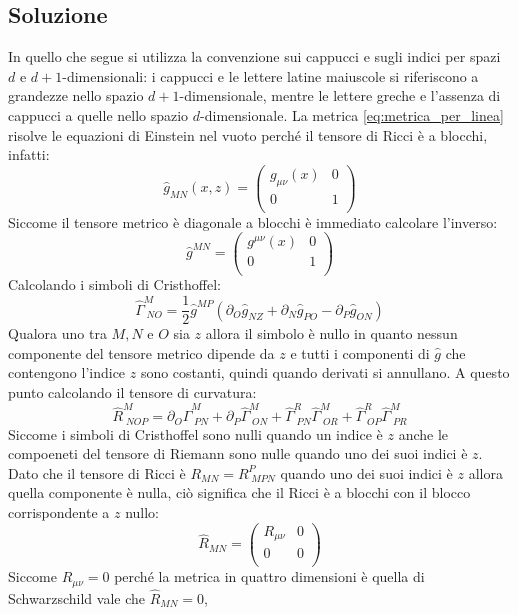 \documentclass[]{scrartcl}
\newcommand{\hg}{\hat{g}}
\begin{document}
\subsection*{Soluzione}
In quello che segue si utilizza la convenzione sui cappucci e sugli indici per spazi $ d $ e $ d+1 $-dimensionali: i cappucci e le lettere latine maiuscole
si riferiscono a grandezze nello spazio $ d+1 $-dimensionale, mentre le lettere greche e l'assenza di cappucci a quelle nello spazio $ d $-dimensionale.
La metrica \eqref{eq:metrica_per_linea} risolve le equazioni di Einstein nel vuoto perché il tensore di Ricci è a blocchi, infatti:
\[
  \hg_{M N}(x,z) =
  \begin{pmatrix}
    g_{\mu\nu}(x) & 0 \\
    0             & 1 \\
  \end{pmatrix}
\]
Siccome il tensore metrico è diagonale a blocchi è immediato calcolare l'inverso:
\[
  \hg^{M N} =
  \begin{pmatrix}
    g^{\mu\nu}(x) & 0 \\
    0             & 1 \\
  \end{pmatrix}
\]
Calcolando i simboli di Cristhoffel:
\[
  \hat{\Gamma}^{M}_{\;NO} = \frac{1}{2} \hg^{MP}\left( \partial_O \hg_{NZ} +  \partial_N \hg_{PO} -  \partial_P \hg_{ON}  \right)
\]
Qualora uno tra $ M, N $ e $ O $ sia $ z $ allora il simbolo è nullo in quanto nessun componente del tensore metrico
dipende da $ z $ e tutti i componenti di $ \hat{g} $ che contengono l'indice $ z $ sono costanti, quindi quando derivati si annullano.
A questo punto calcolando il tensore di curvatura:
\[
  \hat{R}^{M}_{\;NOP} = \partial_O \hat{\Gamma}^{M}_{\;PN} + \partial_P \hat{\Gamma}^{M}_{\;ON} + \hat{\Gamma}^{R}_{\;PN} \hat{\Gamma}^{M}_{\;OR}
  + \hat{\Gamma}^{R}_{\;OP} \hat{\Gamma}^{M}_{\;PR}
\]
Siccome i simboli di Cristhoffel sono nulli quando un indice è $ z $ anche le compoeneti del tensore di Riemann sono nulle quando uno
dei suoi indici è $ z $. Dato che il tensore di Ricci è $ R_{MN} = R^P_{\;MPN} $ quando uno dei suoi indici è $ z $ allora quella componente
è nulla, ciò significa che il Ricci è a blocchi con il blocco corrispondente a $ z $ nullo:
\[
  \hat{R}_{M N} =
  \begin{pmatrix}
    R_{\mu\nu} & 0 \\
    0             & 0 \\
  \end{pmatrix}
\]
Siccome $ R_{\mu\nu} = 0 $ perché la metrica in quattro dimensioni è quella di Schwarzschild vale che $ \hat{R}_{MN} = 0 $,
\end{document}
